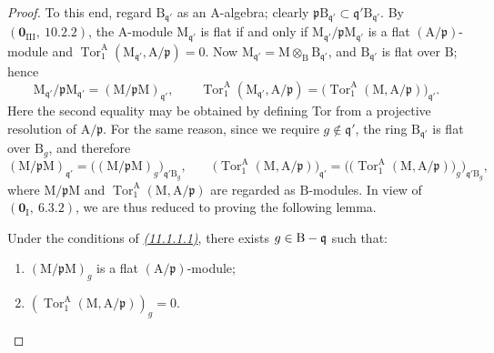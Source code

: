 \begin{proof}
To this end, regard $\mathrm{B}_{\mathfrak{q}'}$ as an $\mathrm{A}$-algebra; clearly
$\mathfrak{p}\mathrm{B}_{\mathfrak{q}'}\subset
\mathfrak{q}'\mathrm{B}_{\mathfrak{q}'}$. By
$(\mathbf{0}_{\mathrm{III}},~10.2.2)$, the $\mathrm{A}$-module
$\mathrm{M}_{\mathfrak{q}'}$ is flat if and only if
$\mathrm{M}_{\mathfrak{q}'}/\mathfrak{p}\mathrm{M}_{\mathfrak{q}'}$ is a
flat $(\mathrm{A}/\mathfrak{p})$-module and $\operatorname{Tor}_1^\mathrm{A}
(\mathrm{M}_{\mathfrak{q}'},\mathrm{A}/\mathfrak{p})=0$.
Now $\mathrm{M}_{\mathfrak{q}'}=
\mathrm{M}\otimes_{\mathrm{B}}\mathrm{B}_{\mathfrak{q}'}$, and
$\mathrm{B}_{\mathfrak{q}'}$ is flat over $\mathrm{B}$; hence
\[
  \mathrm{M}_{\mathfrak{q}'}/\mathfrak{p}\mathrm{M}_{\mathfrak{q}'}
    =(\mathrm{M}/\mathfrak{p}\mathrm{M})_{\mathfrak{q}'},
  \qquad
  \operatorname{Tor}_1^\mathrm{A}
  (\mathrm{M}_{\mathfrak{q}'},\mathrm{A}/\mathfrak{p})
    =\bigl(\operatorname{Tor}_1^\mathrm{A}
      (\mathrm{M},\mathrm{A}/\mathfrak{p})\bigr)_{\mathfrak{q}'}.
\]
Here the second equality may be obtained by defining Tor from a projective
resolution of $\mathrm{A}/\mathfrak{p}$. For the same reason, since we require
$g\notin\mathfrak{q}'$, the ring $\mathrm{B}_{\mathfrak{q}'}$ is flat over
$\mathrm{B}_g$, and therefore
\[
  (\mathrm{M}/\mathfrak{p}\mathrm{M})_{\mathfrak{q}'}
    =\bigl((\mathrm{M}/\mathfrak{p}\mathrm{M})_g
      \bigr)_{\mathfrak{q}'\mathrm{B}_g},
  \qquad
  \bigl(\operatorname{Tor}_1^\mathrm{A}
      (\mathrm{M},\mathrm{A}/\mathfrak{p})\bigr)_{\mathfrak{q}'}
    =\bigl(\bigl(\operatorname{Tor}_1^\mathrm{A}
      (\mathrm{M},\mathrm{A}/\mathfrak{p})\bigr)_g
      \bigr)_{\mathfrak{q}'\mathrm{B}_g},
\]
where $\mathrm{M}/\mathfrak{p}\mathrm{M}$ and
$\operatorname{Tor}_1^\mathrm{A}
(\mathrm{M},\mathrm{A}/\mathfrak{p})$ are regarded as
$\mathrm{B}$-modules. In view of $(\mathbf{0}_\mathrm{I},~6.3.2)$, we are
thus reduced to proving the following lemma.

\begin{lemma}[11.1.1.2]
\label{IV.11.1.1.2}
Under the conditions of \emph{{\hyperref[IV.11.1.1.1]{(11.1.1.1)}}}, there exists $g\in\mathrm{B}-\mathfrak{q}$ such that:
\begin{enumerate}[label=\emph{\roman*)}]
  \item $(\mathrm{M}/\mathfrak{p}\mathrm{M})_g$ is a flat $(\mathrm{A}/\mathfrak{p})$-module;
  \item $(\operatorname{Tor}_1^\mathrm{A}(\mathrm{M},\mathrm{A}/\mathfrak{p}))_g=0$.
\end{enumerate}
\end{lemma}


\end{proof}
